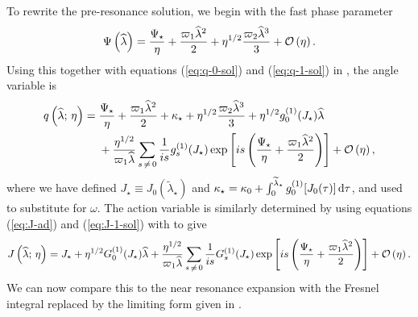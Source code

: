 To rewrite the pre-resonance solution, we begin with the fast phase parameter
\begin{equation}
\Psi\left(\widehat{\lambda}\right) = \dfrac{\Psi_\star}{\eta} + \dfrac{\varpi_1\widehat{\lambda}^2}{2} + \eta^{1/2}\dfrac{\varpi_2\widehat{\lambda}^3}{3} + \mathcal{O}\left({\eta}\right).
\end{equation}
Using this together with equations (\ref{eq:q-0-sol}) and (\ref{eq:q-1-sol}) in , the angle variable is
\begin{align}
q\left(\widehat{\lambda};\,\eta\right) = {} & \dfrac{\Psi_\star}{\eta} + \dfrac{\varpi_1\widehat{\lambda}^2}{2} + \kappa_\star + \eta^{1/2}\dfrac{\varpi_2\widehat{\lambda}^3}{3} + \eta^{1/2}g_0^{(1)}(J_\star)\widehat{\lambda} \nonumber \\* 
 {} & + \dfrac{\eta^{1/2}}{\varpi_1\widehat{\lambda}}\sum_{s\,\neq\,0}\dfrac{1}{is}g_s^{(1)}(J_\star)\exp\left[is\left(\dfrac{\Psi_\star}{\eta} + \dfrac{\varpi_1\widehat{\lambda}^2}{2}\right)\right] + \mathcal{O}\left({\eta}\right),
\end{align}
where we have defined $J_\star \equiv J_0\left(\widetilde{\lambda}_\star\right)$ and $\kappa_\star = \kappa_0 + \int_{0}^{\widetilde{\lambda}_\star}{g_0^{(1)}[J_0(\tau)]}\,\mathrm{d}{\tau}$, and used  to substitute for $\omega$. The action variable is similarly determined by using equations (\ref{eq:J-ad}) and (\ref{eq:J-1-sol}) with  to give
\begin{equation}
J\left(\widehat{\lambda};\,\eta\right) = J_\star + \eta^{1/2}G_0^{(1)}(J_\star)\widehat{\lambda} + \dfrac{\eta^{1/2}}{\varpi_1\widehat{\lambda}}\sum_{s\,\neq\,0}\dfrac{1}{is}G_s^{(1)}(J_\star)\exp\left[is\left(\dfrac{\Psi_\star}{\eta} + \dfrac{\varpi_1\widehat{\lambda}^2}{2}\right)\right] + \mathcal{O}\left({\eta}\right).
\end{equation}
We can now compare this to the near resonance expansion with the Fresnel integral replaced by the limiting form given in .

